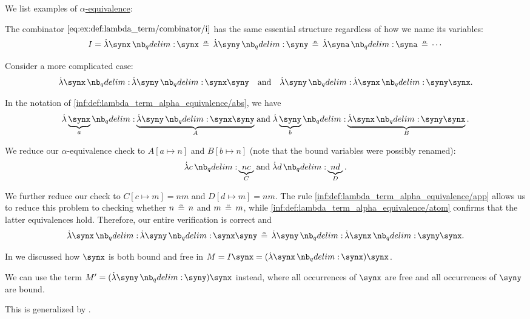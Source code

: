 \begin{example}\label{ex:def:lambda_term_alpha_equivalence}
  We list examples of \hyperref[def:lambda_term_alpha_equivalence]{\( \alpha \)-equivalence}:
  \begin{thmenum}
     The combinator \( \ref{eq:ex:def:lambda_term/combinator/i} \) has the same essential structure regardless of how we name its variables:
    \begin{equation*}
      I = \qabs \synx \synx \aequiv \qabs \syny \syny \aequiv \qabs \syna \syna \aequiv \cdots
    \end{equation*}

     Consider a more complicated case:
    \begin{align*}
      \qabs \synx \qabs \syny \synx \syny
      &&
      \T{and}
      &&
      \qabs \syny \qabs \synx \syny \synx.
    \end{align*}

    In the notation of \ref{inf:def:lambda_term_alpha_equivalence/abs}, we have
    \begin{equation*}
      \qabs {\underbrace{\synx}_a} \underbrace{\qabs \syny \synx \syny}_A
      \T{and}
      \qabs {\underbrace{\syny}_b} \underbrace{\qabs \synx \syny \synx}_B.
    \end{equation*}

    We reduce our \( \alpha \)-equivalence check to \( A[a \mapsto n] \) and \( B[b \mapsto n] \) (note that the bound variables were possibly renamed):
    \begin{equation*}
      \qabs c \underbrace{n c}_C
      \T{and}
      \qabs d \underbrace{n d}_D.
    \end{equation*}

    We further reduce our check to \( C[c \mapsto m] = nm \) and \( D[d \mapsto m] = nm \). The rule \ref{inf:def:lambda_term_alpha_equivalence/app} allows us to reduce this problem to checking whether \( n \aequiv n \) and \( m \aequiv m \), while \ref{inf:def:lambda_term_alpha_equivalence/atom} confirms that the latter equivalences hold. Therefore, our entire verification is correct and
    \begin{equation*}
      \qabs \synx \qabs \syny \synx \syny \aequiv \qabs \syny \qabs \synx \syny \synx.
    \end{equation*}

     In  we discussed how \( \synx \) is both bound and free in \( M = I \synx = (\qabs \synx \synx) \synx \).

    We can use the term \( M' = (\qabs \syny \syny) \synx \) instead, where all occurrences of \( \synx \) are free and all occurrences of \( \syny \) are bound.

    This is generalized by .
  \end{thmenum}
\end{example}

